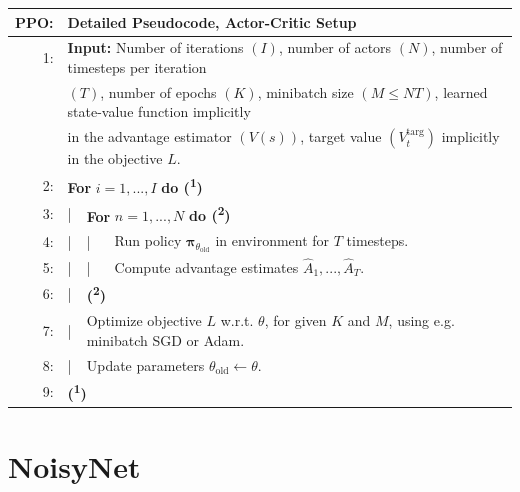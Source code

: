 \begin{table}[h!]
  \centering
  \begin{tabular}{rlll}
    \hline\hline
    \textbf{PPO:} & \multicolumn{3}{l}{Detailed Pseudocode, Actor-Critic Setup}\\
    \hline
    1: & \multicolumn{3}{l}{\textbf{Input:} Number of iterations $\left(I\right)$, number of actors $\left(N\right)$, number of timesteps per iteration}\\
    & \multicolumn{3}{l}{$\left(T\right)$, number of epochs $(K)$, minibatch size $(M \leq NT)$, learned state-value function implicitly}\\
    & \multicolumn{3}{l}{in the advantage estimator $(V(s))$, target value $(V_{t}^{\text{targ}})$ implicitly in the objective $L$.}\\
    2: & \multicolumn{3}{l}{\textbf{For} $i = 1, ..., I$ \textbf{do (\textsuperscript{1})}}\\
    3: & | & \multicolumn{2}{l}{\textbf{For} $n = 1, ..., N$ \textbf{do (\textsuperscript{2})}}\\
    4: & | & | & Run policy $\boldsymbol{\pi}_{\theta_{\text{old}}}$ in environment for $T$ timesteps.\\
    5: & | & | & Compute advantage estimates $\hat{A}_{1}, ..., \hat{A}_{T}$.\\
    6: & | & \multicolumn{2}{l}{\textbf{(\textsuperscript{2})}}\\
    7: & | & \multicolumn{2}{l}{Optimize objective $L$ w.r.t. $\theta$, for given $K$ and $M$, using e.g. minibatch SGD or Adam.}\\
    8: & | & \multicolumn{2}{l}{Update parameters $\theta_{\text{old}} \leftarrow \theta$.}\\
    9: & \multicolumn{3}{l}{\textbf{(\textsuperscript{1})}}\\
    \hline\hline
  \end{tabular}
\end{table}

\clearpage
\hypertarget{algo-noisynet}{\section{NoisyNet}}

